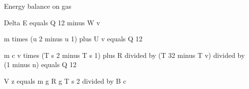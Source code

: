 Energy balance on gas

Delta E equals Q 12 minus W v

m times (u 2 minus u 1) plus U v equals Q 12

m c v times (T s 2 minus T s 1) plus R divided by (T 32 minus T v) divided by (1 minus n) equals Q 12

V z equals m g R g T s 2 divided by B c